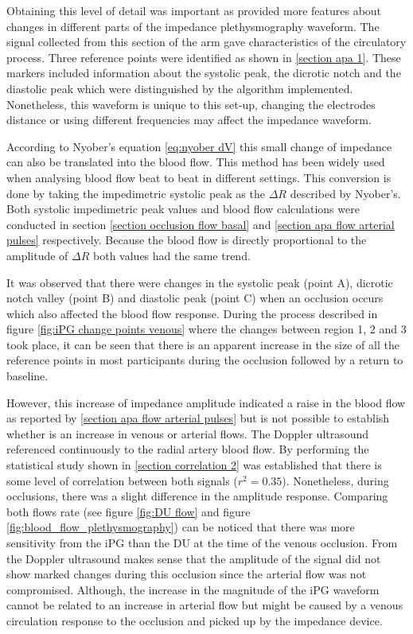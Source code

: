 Obtaining this level of detail was important as provided more features about changes in different parts of the impedance plethysmography waveform. The signal collected from this section of the arm gave characteristics of the circulatory process. Three reference points were identified as shown in \ref{section apa 1}. These markers included information about the systolic peak, the dicrotic notch and the diastolic peak which were distinguished by the algorithm implemented. Nonetheless, this waveform is unique to this set-up, changing the electrodes distance or using different frequencies may affect the impedance waveform.

According to Nyober's equation \ref{eq:nyober dV} this small change of impedance can also be translated into the blood flow.  This method has been widely used when analysing blood flow beat to beat \cite{costeloe1980continuous,anderson1984impedance,mohapatra1981non,golden1986assessment} in different settings. This conversion is done by taking the impedimetric systolic peak as the $\Delta R$ described by Nyober's. Both systolic impedimetric peak values and blood flow calculations were conducted in section \ref{section occlusion flow basal} and \ref{section apa flow arterial pulses} respectively.  Because the blood flow is directly proportional to the amplitude of $\Delta R$ both values had the same trend. 

It was observed that there were changes in the systolic peak (point A), dicrotic notch valley (point B) and diastolic peak (point C) when an occlusion occurs which also affected the blood flow response. During the process described in figure \ref{fig:iPG change points venous} where the changes between region 1, 2 and 3 took place, it can be seen that there is an apparent increase in the size of all the reference points in most participants during the occlusion followed by a return to baseline. 

However, this increase of impedance amplitude indicated a raise in the blood flow as reported by \ref{section apa flow arterial pulses} but is not possible to establish whether is an increase in venous or arterial flows. The Doppler ultrasound referenced continuously to the radial artery blood flow. By performing the statistical study shown in \ref{section correlation 2} was established that there is some level of correlation between both signals ($r^2 = 0.35$). Nonetheless, during occlusions, there was a slight difference in the amplitude response. Comparing both flows rate (see figure \ref{fig:DU flow} and figure \ref{fig:blood_flow_plethysmography}) can be noticed that there was more sensitivity from the iPG than the DU at the time of the venous occlusion. From the Doppler ultrasound makes sense that the amplitude of the signal did not show marked changes during this occlusion since the arterial flow was not compromised. Although, the increase in the magnitude of the iPG waveform cannot be related to an increase in arterial flow but might be caused by a venous circulation response to the occlusion and picked up by the impedance device. 

